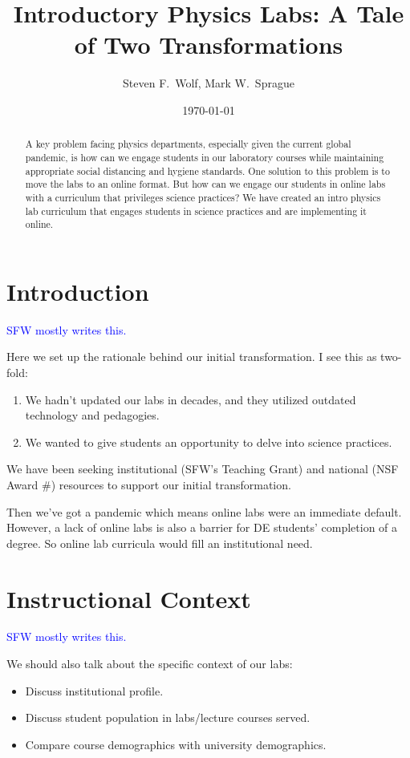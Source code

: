 \documentclass{article}
\title{Introductory Physics Labs:  A Tale of Two Transformations}
\author{Steven F.\ Wolf, Mark W.\ Sprague}
\date{\today}
\begin{document}
\maketitle

\begin{abstract}
  A key problem facing physics departments, especially given the current global pandemic, is
  how can we engage students in our laboratory courses while maintaining appropriate social
  distancing and hygiene standards.  One solution to this problem is to move the labs to an
  online format.  But how can we engage our students in online labs with a curriculum that
  privileges science practices?  We have created an intro physics lab curriculum that engages
  students in science practices and are implementing it online.
\end{abstract}

\section{Introduction}
\textcolor{blue}{SFW mostly writes this.}

Here we set up the rationale behind our initial transformation.  I see this as two-fold:
\begin{enumerate}
  \item We hadn't updated our labs in decades, and they utilized outdated technology and
  pedagogies.
  \item We wanted to give students an opportunity to delve into science practices.
\end{enumerate}
We have been seeking institutional (SFW's Teaching Grant) and national (NSF Award \#) resources
to support our initial transformation.

Then we've got a pandemic which means online labs were an immediate default. However, a lack of
online labs is also a barrier for DE students' completion of a degree.  So online lab curricula
would fill an institutional need.

\section{Instructional Context}
\textcolor{blue}{SFW mostly writes this.}

We should also talk about the specific context of our labs:
\begin{itemize}
  \item Discuss institutional profile.
  \item Discuss student population in labs/lecture courses served.
  \item Compare course demographics with university demographics.
\end{itemize}
\end{document}
